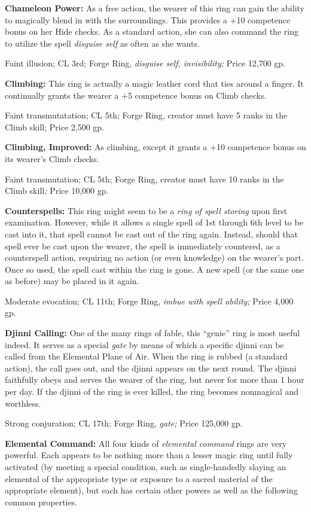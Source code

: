 \textbf{Chameleon Power: }As a free action, the wearer of this ring can gain the 
ability to magically blend in with the surroundings. This provides a +10 competence 
bonus on her Hide checks. As a standard action, she can also command the ring to 
utilize the spell \textit{disguise self }as often as she wants.

Faint illusion; CL 3rd; Forge Ring, \textit{disguise self, invisibility; }Price 
12,700 gp.

\textbf{Climbing: }This ring is actually a magic leather cord that ties around 
a finger. It continually grants the wearer a +5 competence bonus on Climb checks.

Faint transmutatation; CL 5th; Forge Ring, creator must have 5 ranks in the Climb 
skill; Price 2,500 gp.

\textbf{Climbing, Improved: }As climbing, except it grants a +10 competence bonus 
on its wearer's Climb checks.

Faint transmutation; CL 5th; Forge Ring, creator must have 10 ranks in the Climb 
skill\textit{; }Price 10,000 gp.

\textbf{Counterspells:} This ring might seem to be a \textit{ring of spell storing 
}upon first examination. However, while it allows a single spell of 1st through 
6th level to be cast into it, that spell cannot be cast out of the ring again. 
Instead, should that spell ever be cast upon the wearer, the spell is immediately 
countered, as a counterspell action, requiring no action (or even knowledge) on 
the wearer's part. Once so used, the spell cast within the ring is gone. A new 
spell (or the same one as before) may be placed in it again.

Moderate evocation; CL 11th; Forge Ring, \textit{imbue with spell ability; }Price 
4,000 gp.

\textbf{Djinni Calling: }One of the many rings of fable, this ``genie'' ring is 
most useful indeed. It serves as a special \textit{gate }by means of which a specific 
djinni can be called from the Elemental Plane of Air. When the ring is rubbed (a 
standard action), the call goes out, and the djinni appears on the next round. 
The djinni faithfully obeys and serves the wearer of the ring, but never for more 
than 1 hour per day. If the djinni of the ring is ever killed, the ring becomes 
nonmagical and worthless.

Strong conjuration; CL 17th; Forge Ring, \textit{gate; }Price 125,000 gp.

\textbf{Elemental Command: }All four kinds of \textit{elemental command }rings 
are very powerful. Each appears to be nothing more than a lesser magic ring until 
fully activated (by meeting a special condition, such as single-handedly slaying 
an elemental of the appropriate type or exposure to a sacred material of the appropriate 
element), but each has certain other powers as well as the following common properties.

